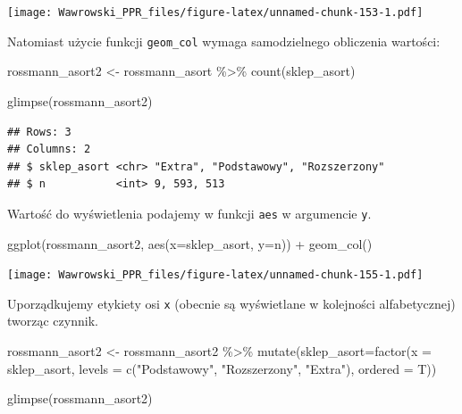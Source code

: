 \documentclass[
]{book}
\newenvironment{Shaded}{\begin{snugshade}}{\end{snugshade}}
\newcommand{\AttributeTok}[1]{\textcolor[rgb]{0.77,0.63,0.00}{#1}}
\newcommand{\FunctionTok}[1]{\textcolor[rgb]{0.00,0.00,0.00}{#1}}
\newcommand{\NormalTok}[1]{#1}
\newcommand{\OtherTok}[1]{\textcolor[rgb]{0.56,0.35,0.01}{#1}}
\newcommand{\SpecialCharTok}[1]{\textcolor[rgb]{0.00,0.00,0.00}{#1}}
\newcommand{\StringTok}[1]{\textcolor[rgb]{0.31,0.60,0.02}{#1}}
\begin{document}
\texttt{[image: Wawrowski\_PPR\_files/figure-latex/unnamed-chunk-153-1.pdf]}

Natomiast użycie funkcji \texttt{geom\_col} wymaga samodzielnego obliczenia wartości:

\begin{Shaded}
\begin{Highlighting}[]
\NormalTok{rossmann\_asort2 }\OtherTok{\textless{}{-}}\NormalTok{ rossmann\_asort }\SpecialCharTok{\%\textgreater{}\%}
  \FunctionTok{count}\NormalTok{(sklep\_asort)}

\FunctionTok{glimpse}\NormalTok{(rossmann\_asort2)}
\end{Highlighting}
\end{Shaded}

\begin{verbatim}
## Rows: 3
## Columns: 2
## $ sklep_asort <chr> "Extra", "Podstawowy", "Rozszerzony"
## $ n           <int> 9, 593, 513
\end{verbatim}

Wartość do wyświetlenia podajemy w funkcji \texttt{aes} w argumencie \texttt{y}.

\begin{Shaded}
\begin{Highlighting}[]
\FunctionTok{ggplot}\NormalTok{(rossmann\_asort2, }\FunctionTok{aes}\NormalTok{(}\AttributeTok{x=}\NormalTok{sklep\_asort, }\AttributeTok{y=}\NormalTok{n)) }\SpecialCharTok{+}
  \FunctionTok{geom\_col}\NormalTok{()}
\end{Highlighting}
\end{Shaded}

\texttt{[image: Wawrowski\_PPR\_files/figure-latex/unnamed-chunk-155-1.pdf]}

Uporządkujemy etykiety osi \texttt{x} (obecnie są wyświetlane w kolejności alfabetycznej) tworząc czynnik.

\begin{Shaded}
\begin{Highlighting}[]
\NormalTok{rossmann\_asort2 }\OtherTok{\textless{}{-}}\NormalTok{ rossmann\_asort2 }\SpecialCharTok{\%\textgreater{}\%}
  \FunctionTok{mutate}\NormalTok{(}\AttributeTok{sklep\_asort=}\FunctionTok{factor}\NormalTok{(}\AttributeTok{x =}\NormalTok{ sklep\_asort,}
                            \AttributeTok{levels =} \FunctionTok{c}\NormalTok{(}\StringTok{"Podstawowy"}\NormalTok{, }
                                       \StringTok{"Rozszerzony"}\NormalTok{, }
                                       \StringTok{"Extra"}\NormalTok{), }
                            \AttributeTok{ordered =}\NormalTok{ T))}

\FunctionTok{glimpse}\NormalTok{(rossmann\_asort2)}
\end{Highlighting}
\end{Shaded}
\end{document}
